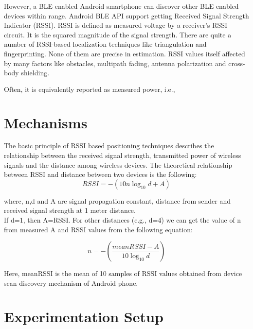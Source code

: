 \documentclass[conference,a4paper]{../../sty/IEEEtran}
\begin{document}
However, a BLE enabled Android smartphone can discover other BLE enabled devices within range. Android BLE API support getting Received Signal Strength Indicator (RSSI). RSSI is defined as measured voltage by a receiver’s RSSI circuit. It is the squared magnitude of the signal strength. There are quite a number of RSSI-based localization techniques like triangulation and fingerprinting. None of them are precise in estimation. RSSI values itself affected by many factors like obstacles, multipath fading, antenna polarization and cross-body shielding.


 Often, it is equivalently 
reported as measured power, i.e., 
\section{Mechanisms}

The basic principle of RSSI based positioning techniques describes the relationship between the received signal strength, transmitted power of wireless signals and the distance among wireless devices. The theoretical relationship between RSSI and distance between two devices is the following: \cite{chung2007enhanced}
\begin{equation}
  RSSI = -(10n \log_{10}d + A)
\end{equation}

where, n,d and A are signal propagation constant, distance from sender and received signal strength at 1 meter distance. \\

If d=1, then A=RSSI. For other distances (e.g., d=4) we can get the value of n from measured A and RSSI values from the following equation:

\begin{equation}
 n = -(\frac{ meanRSSI-A}{10 \log_{10}d})
\end{equation}

Here, meanRSSI is the mean of 10 samples of RSSI values obtained from device scan discovery mechanism of Android phone.

\section{Experimentation Setup}
\end{document}
